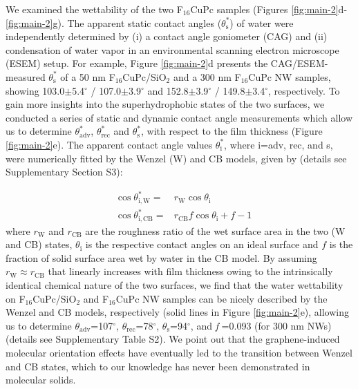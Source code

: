 \documentclass[journal=nalefd,manuscript=letter,email=true,hyperref=true,keywords=true]{achemso}
\begin{document}
We examined the wettability of the two F\(_{\text{16}}\)CuPc samples (Figures
\ref{fig:main-2}d-\ref{fig:main-2}g). The apparent static contact
angles (\(\theta_{\mathrm{s}}^{*}\)) of water were independently
determined by (i) a contact angle goniometer (CAG) and (ii) condensation
of  water vapor in an environmental scanning electron
microscope (ESEM) setup. For example, Figure \ref{fig:main-2}d
presents the CAG/ESEM-measured \(\theta_{\mathrm{s}}^{*}\) of a 50 nm
F\(_{\text{16}}\)CuPc/SiO\(_{\text{2}}\) and a 300 nm F\(_{\text{16}}\)CuPc NW samples, showing
103.0\(\pm\)5.4\(^{\circ}\) / 107.0\(\pm\)3.9\(^{\circ}\) and
152.8\(\pm\)3.9\(^{\circ}\) / 149.8\(\pm\)3.4\(^{\circ}\),
respectively. To gain more insights into the superhydrophobic states
of the two surfaces, we conducted a series of static and dynamic
contact angle measurements which allow us to determine
\(\theta_{\mathrm{adv}}^{*}\), \(\theta_{\mathrm{rec}}^{*}\) and
\(\theta_{\mathrm{s}}^{*}\), with respect to the film thickness (Figure
\ref{fig:main-2}e). The apparent contact angle values
\(\theta_{\mathrm{i}}^{*}\), where i=adv, rec, and s, were numerically
fitted by the Wenzel (W) \cite{Wenzel_1936} and CB \cite{Cassie_1944}
models, given by (details see Supplementary Section S3):

\begin{eqnarray}
\label{eq:2}
&\cos \theta^{*}_{\mathrm{i,W}} =& r_{\mathrm{W}} \cos \theta_{\mathrm{i}} \\
&\cos \theta^{*}_{\mathrm{i,CB}} =& r_{\mathrm{CB}} f \cos \theta_{\mathrm{i}} + f - 1
\end{eqnarray}
where \(r_{\mathrm{W}}\) and \(r_{\mathrm{CB}}\) are the roughness ratio
of the wet surface area in the two (W and CB) states,
\(\theta_{\mathrm{i}}\) is the respective contact angles on an ideal
surface and \(f\) is the fraction of solid surface area wet by water in
the CB model. By assuming \(r_{\mathrm{W}} \approx r_{\mathrm{CB}}\)
that linearly increases with film thickness owing to the intrinsically identical
chemical nature of the two surfaces, we find that the water
wettability on F\(_{\text{16}}\)CuPc/SiO\(_{\text{2}}\) and F\(_{\text{16}}\)CuPc NW samples can be
nicely described by the Wenzel and CB models, respectively (solid
lines in Figure \ref{fig:main-2}e), allowing us to determine
\(\theta_{\mathrm{adv}}\)=107\(^{\circ}\),
\(\theta_{\mathrm{rec}}\)=78\(^{\circ}\),
\(\theta_{\mathrm{s}}\)=94\(^{\circ}\), and \emph{f} =0.093 (for 300 nm
NWs) (details see Supplementary Table S2).  We point out that the
graphene-induced molecular orientation effects have eventually led to
the transition between Wenzel and CB states, which to our knowledge
has never been demonstrated in molecular solids.
\end{document}
